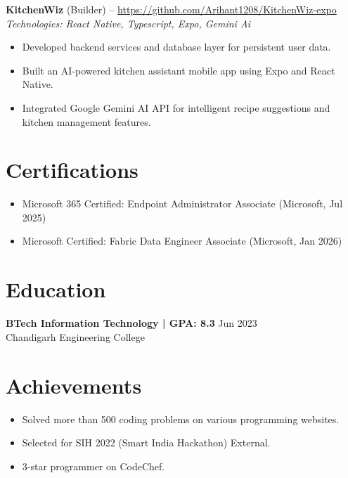 \documentclass[11pt,a4paper]{article}
\begin{document}
\vspace{2pt}
\textbf{KitchenWiz} (Builder) -- \href{https://github.com/Arihant1208/KitchenWiz-expo}{https://github.com/Arihant1208/KitchenWiz-expo}
\\ \textit{Technologies: React Native, Typescript, Expo, Gemini Ai}
\begin{itemize}
  \item Developed backend services and database layer for persistent user data.
  \item Built an AI-powered kitchen assistant mobile app using Expo and React Native.
  \item Integrated Google Gemini AI API for intelligent recipe suggestions and kitchen management features.
\end{itemize}
\vspace{2pt}

\section{Certifications}
\begin{itemize}
  \item Microsoft 365 Certified: Endpoint Administrator Associate (Microsoft, Jul 2025)
  \item Microsoft Certified: Fabric Data Engineer Associate (Microsoft, Jan 2026)
\end{itemize}

\section{Education}
\textbf{BTech Information Technology | GPA: 8.3} \hfill Jun 2023
\\ Chandigarh Engineering College
\vspace{2pt}

\section{Achievements}
\begin{itemize}
  \item Solved more than 500 coding problems on various programming websites.
  \item Selected for SIH 2022 (Smart India Hackathon) External.
  \item 3-star programmer on CodeChef.
\end{itemize}
\end{document}
